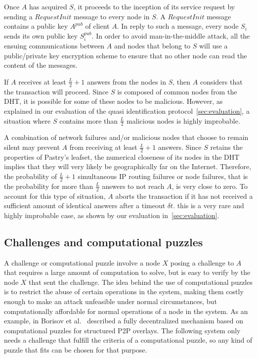Once $A$ has acquired $S$, it proceeds to the inception of its service request
by sending a $RequestInit$ message to every node in $S$. A $RequestInit$
message contains a public key $A^{pub}$ of client $A$. In reply to such a
message, every node $S_i$ sends its own public key $S^{pub}_i$. In order to
avoid man-in-the-middle attack, all the ensuing communications between $A$ and
nodes that belong to $S$ will use a public/private key encryption scheme to
ensure that no other node can read the content of the messages.

If $A$ receives at least $\frac{L}{2} + 1$ answers from the nodes in $S$, then
$A$ considers that the transaction will proceed. Since $S$ is composed of
common nodes from the DHT, it is possible for some of these nodes to be
malicious. However, as explained in our evaluation of the quasi identification
protocol~\ref{sec:evaluation}, a situation where $S$ contains more than
$\frac{L}{2}$ malicious nodes is highly improbable.

A combination of network failures and/or malicious nodes that choose to remain
silent may prevent $A$ from receiving at least $\frac{L}{2} + 1$ answers. Since
$S$ retains the properties of Pastry's leafset, the numerical closeness of its
nodes in the DHT implies that they will very likely be geographically far on
the Internet. Therefore, the probability of $\frac{L}{2} + 1 $ simultaneous IP
routing failures or node failures, that is the probability for more than
$\frac{L}{2}$ answers to not reach $A$, is very close to zero. To account for
this type of situation, $A$ aborts the transaction if it has not received a
sufficient amount of identical answers after a timeout $\delta t$. this is a
very rare and highly improbable case, as shown by our evaluation
in~\ref{sec:evaluation}.


\subsection{Challenges and computational puzzles}
\label{sec:challenges_puzzles}
A challenge or computational puzzle involve a node $X$ posing a challenge to
$A$ that requires a large amount of computation to solve, but is easy to verify
by the node $X$ that sent the challenge. The idea behind the use of
computational puzzles is to restrict the abuse of certain operations in the
system, making them costly enough to make an attack unfeasible under normal
circumstances, but computationally affordable for normal operations of a node
in the system. As an example, in Borisov et al.~\cite{borisov2006computational} described a
fully decentralized mechanism based on computational puzzles for structured P2P
overlays. The following system only needs a challenge that fulfill the
criteria of a computational puzzle, so any kind of puzzle that fits can be chosen for
that purpose.

